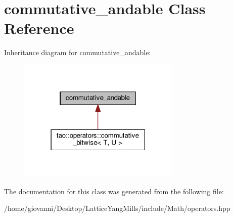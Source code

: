 \hypertarget{classcommutative__andable}{}\section{commutative\+\_\+andable Class Reference}
\label{classcommutative__andable}


Inheritance diagram for commutative\+\_\+andable\+:\nopagebreak
\begin{figure}[H]
\begin{center}
\leavevmode
\includegraphics[width=219pt]{classcommutative__andable__inherit__graph}
\end{center}
\end{figure}


The documentation for this class was generated from the following file\+:\begin{DoxyCompactItemize}
\item 
/home/giovanni/\+Desktop/\+Lattice\+Yang\+Mills/include/\+Math/operators.\+hpp\end{DoxyCompactItemize}

